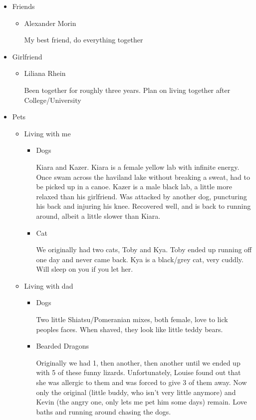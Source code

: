 \documentclass[11pt]{article}
\begin{document}
\begin{itemize}
\item Friends
\label{sec:org0805063}
\begin{itemize}
\item Alexander Morin
\label{sec:org205082c}

My best friend, do everything together
\end{itemize}

\item Girlfriend
\label{sec:org0f793f1}
\begin{itemize}
\item Liliana Rhein
\label{sec:org11fb004}

Been together for roughly three years. Plan on living together after College/University
\end{itemize}

\item Pets
\label{sec:orgcf236e0}
\begin{itemize}
\item Living with me
\label{sec:org6bb1e2c}
\begin{itemize}
\item Dogs
\label{sec:org2c4b53a}

Kiara and Kazer. Kiara is a female yellow lab with infinite energy. Once swam across the haviland lake without breaking a sweat, had to be picked up in a canoe. Kazer is a male black lab, a little more relaxed than his girlfriend. Was attacked by another dog, puncturing his back and injuring his knee. Recovered well, and is back to running around, albeit a little slower than Kiara.

\item Cat
\label{sec:org3662cc4}

We originally had two cats, Toby and Kya. Toby ended up running off one day and never came back. Kya is a black/grey cat, very cuddly. Will sleep on you if you let her.
\end{itemize}

\item Living with dad
\label{sec:org20d1582}
\begin{itemize}
\item Dogs
\label{sec:org6153a88}

Two little Shiatsu/Pomeranian mixes, both female, love to lick peoples faces. When shaved, they look like little teddy bears.

\item Bearded Dragons
\label{sec:org551993c}

Originally we had 1, then another, then another until we ended up with 5 of these funny lizards. Unfortunately, Louise found out that she was allergic to them and was forced to give 3 of them away. Now only the original (little buddy, who isn't very little anymore) and Kevin (the angry one, only lets me pet him some days) remain. Love baths and running around chasing the dogs.


\end{itemize}
\end{itemize}
\end{itemize}
\end{document}
